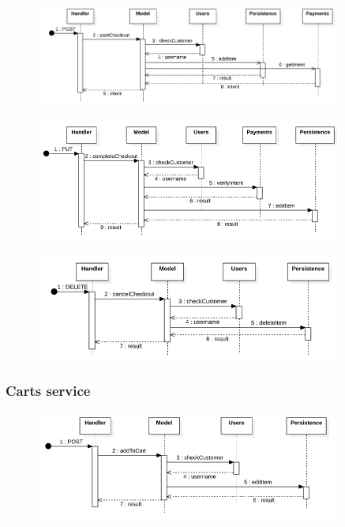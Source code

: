 \begin{figure}[H]
    \includegraphics[width=0.9\textwidth]{res/images/sequence-diagrams/orders/startCheckout.png}
\end{figure}

\begin{figure}[H]
    \includegraphics[width=0.9\textwidth]{res/images/sequence-diagrams/orders/completeCheckout.png}
\end{figure}

\begin{figure}[H]
    \includegraphics[width=0.9\textwidth]{res/images/sequence-diagrams/orders/cancelCheckout.png}
\end{figure}

\subsubsection{Carts service}

\begin{figure}[H]
    \includegraphics[width=0.9\textwidth]{res/images/sequence-diagrams/carts/addToCart.png}
\end{figure}

